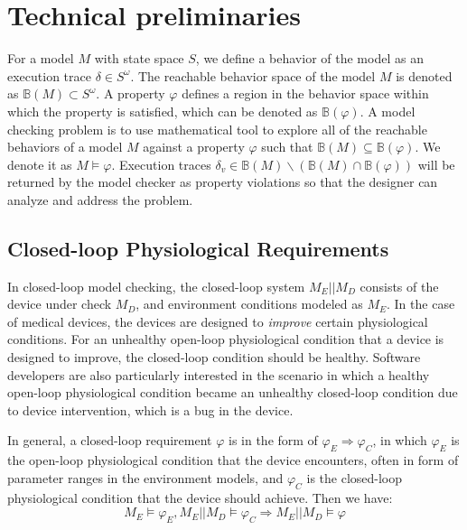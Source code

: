 \section{Technical preliminaries}
\label{preliminaries}
For a model $M$ with state space $S$, we define a behavior of the model as an execution trace $\delta\in S^\omega$. The reachable behavior space of the model $M$ is denoted as $\mathbb{B}(M)\subset S^\omega$. A property $\varphi$ defines a region in the behavior space within which the property is satisfied, which can be denoted as $\mathbb{B}(\varphi)$. A model checking problem is to use mathematical tool to explore all of the reachable behaviors of a model $M$ against a property $\varphi$ such that $\mathbb{B}(M)\subseteq \mathbb{B}(\varphi)$. We denote it as $M\models\varphi$. Execution traces $\delta_v\in\mathbb{B}(M)\backslash (\mathbb{B}(M)\cap\mathbb{B}(\varphi))$ will be returned by the model checker as property violations so that the designer can analyze and address the problem. 

\subsection{Closed-loop Physiological Requirements}
In closed-loop model checking, the closed-loop system $M_E||M_D$ consists of the device under check $M_D$, and environment conditions modeled as $M_E$. In the case of medical devices, the devices are designed to \emph{improve} certain physiological conditions. For an unhealthy open-loop physiological condition that a device is designed to improve, the closed-loop condition should be healthy. Software developers are also particularly interested in the scenario in which a healthy open-loop physiological condition became an unhealthy closed-loop condition due to device intervention, which is a bug in the device.

In general, a closed-loop requirement $\varphi$ is in the form of $\varphi_E\Rightarrow \varphi_C$, in which $\varphi_E$ is the open-loop physiological condition that the device encounters, often in form of parameter ranges in the environment models, and $\varphi_C$ is the closed-loop physiological condition that the device should achieve. Then we have:
 \begin{equation}\label{req_def}
M_E\models\varphi_E, M_E||M_D\models \varphi_C\Rightarrow M_E||M_D\models\varphi
\end{equation}

